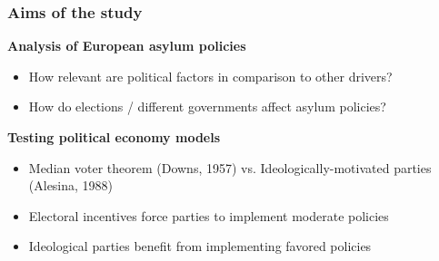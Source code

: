 \documentclass[compress, xcolor = {table,xcdraw}]{beamer}
\begin{document}
%	
%	
%
%  


\begin{frame} [t]
\frametitle{Aims of the study}

\bigskip

\textbf{Analysis of European asylum policies}
\begin{itemize}
	\item How relevant are political factors in comparison to other drivers?	
	\item How do elections / different governments affect asylum policies?
\end{itemize}

\bigskip

\textbf{Testing political economy models} \\

\begin{itemize}
  \item Median voter theorem (Downs, 1957) vs. Ideologically-motivated parties (Alesina, 1988)
	\item Electoral incentives force parties to implement moderate policies	
	\item Ideological parties benefit from implementing favored policies
\end{itemize}

\end{frame}
\end{document}
